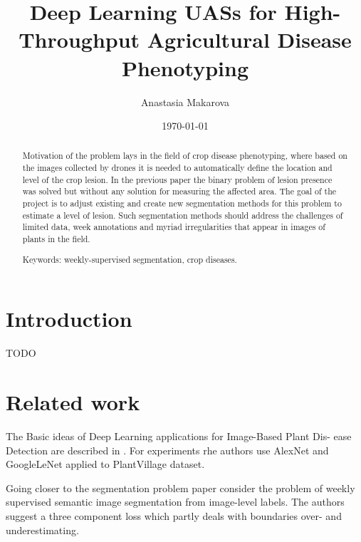 \documentclass[12pt,a4paper,notitlepage]{amsart}
\begin{document}
	\title{Deep Learning UASs for High-Throughput
Agricultural Disease Phenotyping}
	\author{Anastasia Makarova}
	\date{\today}
	
	\maketitle
	
	\begin{abstract} 
Motivation of the problem lays in the field of crop disease phenotyping, where based on the images collected by drones it is needed to automatically define the location and level of the crop lesion. In the previous paper the binary problem of lesion presence was solved but without any solution for measuring the affected area. The goal of the project is to adjust existing and create new segmentation methods for this problem to estimate a level of lesion. Such segmentation methods should address the challenges of limited data, week annotations and myriad irregularities that appear in images of plants in the field.
	
	Keywords: weekly-supervised segmentation, crop diseases.
	\end{abstract}


   \section{Introduction}    
   
   TODO
   
   \section{Related work}
   
	The Basic ideas of Deep Learning applications for Image-Based Plant Dis-
ease Detection are described in \cite{sharada2016plants}. For experiments rhe authors use AlexNet and GoogleLeNet applied to PlantVillage dataset. 

Going closer to the segmentation problem paper \cite{kolesnikov2016} consider the problem of weekly supervised semantic image segmentation from image-level labels. The authors suggest a  three component loss which partly deals with boundaries over- and underestimating.
\end{document}

